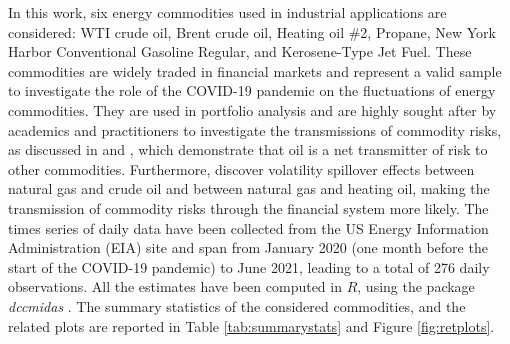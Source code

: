 In this work, six energy commodities used in industrial applications are considered: WTI crude oil, Brent crude oil, Heating oil \#2, Propane, New York Harbor Conventional Gasoline Regular, and Kerosene-Type Jet Fuel. These commodities are widely traded in financial markets and  represent a valid sample to investigate the role of the COVID-19 pandemic on the fluctuations of energy commodities. {They are used in portfolio analysis and are highly sought after by academics and practitioners to investigate the transmissions of commodity risks, as discussed in \cite{naeem2021spillover} and \cite{chevallier2013volatility}, which demonstrate that oil is a net transmitter of risk to other commodities. Furthermore,  \cite{karali2014macro} discover volatility spillover effects between natural gas and crude oil and between natural gas and heating oil, making the transmission of commodity risks through the financial system more likely.}
The times series of daily data have been collected from the US Energy Information Administration (EIA) site and span from January 2020 (one month before the start of the COVID-19 pandemic) to June 2021, leading to a total of 276 daily observations. {All the estimates have been computed in $R$, using the package \emph{dccmidas} \citep{Candila:2021}.} The summary statistics of the considered commodities, and the related plots are reported in Table \ref{tab:summarystats} and Figure \ref{fig:retplots}.


